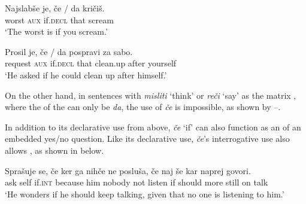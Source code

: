 \documentclass[output=paper,colorlinks,citecolor=brown]{langsci/langscibook}
\begin{document}
\begin{exe}
\ex \label{ex:plesnicar:twentyfive}
\gll Najslabše 	je, 	če / \hspace{-2pt} da 		kričiš.\\
  worst		\textsc{aux}	if.\textsc{decl} {} {} that	scream\\
\trans `The worst is if you scream.'
\end{exe}


\begin{exe}
\ex \label{ex:plesnicar:twentysix}
\gll Prosil 		je, 	če / \hspace{-2pt} da 		pospravi 	za 	sabo.\\
 request		\textsc{aux}	if.\textsc{decl} {} {} that	clean.up 	after	yourself \\
\trans `He asked if he could clean up after himself.'
\end{exe}

\noindent On the other hand, in sentences with \textit{misliti} `think' or \textit{reči} `say' as the matrix , where the  of the  can only be \textit{da}, the use of \textit{če} is impossible, as shown by --.

\begin{exe}
\end{exe}


\begin{exe}
\end{exe}

\noindent In addition to its declarative use from above, \textit{če} `if' can also function as an  of an embedded yes/no question. Like its declarative use, \textit{če}’s interrogative use also allows , as shown in  below.

\begin{exe}
\ex \label{ex:plesnicar:twentynine}
\gll Sprašuje se,	če	ker	ga	nihče		ne	posluša,	če	naj		še	kar	naprej	govori. \\
   ask  self 	if.\textsc{int} because him nobody	not	listen if should more	still	on	talk\\
\trans `He wonders if he should keep talking, given that no one is listening to him.'
\end{exe}
\end{document}
